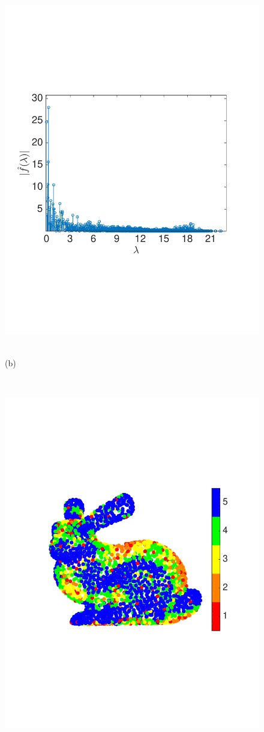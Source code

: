 \documentclass{article}
\begin{document}
\begin{figure}[tbh]
\begin{minipage}[m]{0.48\linewidth}
\centerline{\includegraphics[width=.8\linewidth]{fig_bunny_signal_hat}~~~~~~~}
\centerline{\small{(b)}}
\end{minipage} \\
\begin{minipage}[m]{0.48\linewidth}
\centerline{\includegraphics[width=.8\linewidth]{fig_bunny_partition}}

\end{minipage}
\end{figure}
\end{document}
